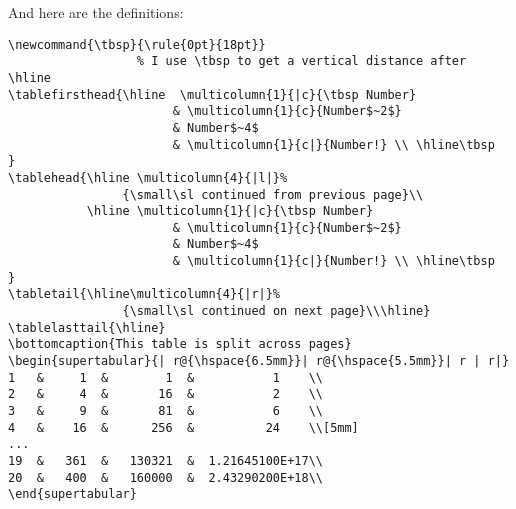And here are the definitions:
\begin{verbatim}
\newcommand{\tbsp}{\rule{0pt}{18pt}}
                  % I use \tbsp to get a vertical distance after \hline
\tablefirsthead{\hline  \multicolumn{1}{|c}{\tbsp Number}
                       & \multicolumn{1}{c}{Number$~2$}
                       & Number$~4$
                       & \multicolumn{1}{c|}{Number!} \\ \hline\tbsp  }
\tablehead{\hline \multicolumn{4}{|l|}%
                {\small\sl continued from previous page}\\
           \hline \multicolumn{1}{|c}{\tbsp Number}
                       & \multicolumn{1}{c}{Number$~2$}
                       & Number$~4$
                       & \multicolumn{1}{c|}{Number!} \\ \hline\tbsp  }
\tabletail{\hline\multicolumn{4}{|r|}%
                {\small\sl continued on next page}\\\hline}
\tablelasttail{\hline}
\bottomcaption{This table is split across pages}
\begin{supertabular}{| r@{\hspace{6.5mm}}| r@{\hspace{5.5mm}}| r | r|}
1   &     1  &        1  &           1    \\
2   &     4  &       16  &           2    \\
3   &     9  &       81  &           6    \\
4   &    16  &      256  &          24    \\[5mm]
...
19  &   361  &   130321  &  1.21645100E+17\\
20  &   400  &   160000  &  2.43290200E+18\\
\end{supertabular}
\end{verbatim}
 

